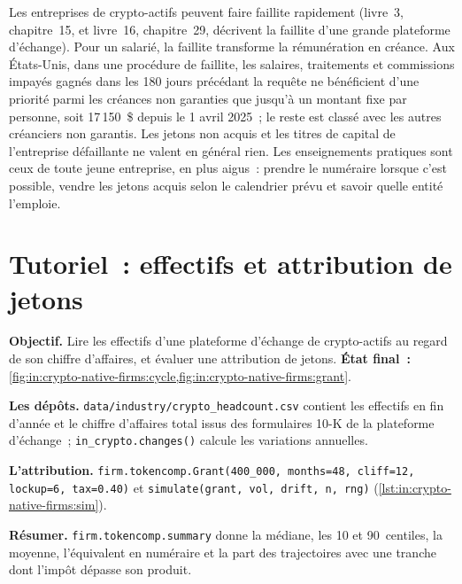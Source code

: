 Les entreprises de crypto-actifs peuvent faire faillite rapidement (livre~3, chapitre~15, et livre~16, chapitre~29, décrivent la faillite d'une grande plateforme d'échange). Pour un
salarié, la faillite transforme la rémunération en créance. Aux États-Unis, dans une procédure de faillite,
les salaires, traitements et commissions impayés gagnés dans les 180 jours précédant la requête ne bénéficient d'une priorité parmi les créances non garanties
que jusqu'à un montant fixe par personne, soit 17\,150~\$ depuis le 1 avril 2025~; le reste est classé avec les autres créanciers non garantis.
Les jetons non acquis et les titres de capital de l'entreprise défaillante ne valent en général rien. Les enseignements pratiques sont ceux de toute
jeune entreprise, en plus aigus~: prendre le numéraire lorsque c'est possible, vendre les jetons acquis selon le calendrier prévu et savoir quelle entité
l'emploie.

\section{Tutoriel~: effectifs et attribution de jetons}\label{tut:in:crypto-native-firms:tut}

\begin{tutorial}
\textbf{Objectif.} Lire les effectifs d'une plateforme d'échange de crypto-actifs au regard de son chiffre d'affaires, et évaluer une attribution de jetons.
\textbf{État final~:} \cref{fig:in:crypto-native-firms:cycle,fig:in:crypto-native-firms:grant}.
\begin{tutsteps}
\item \textbf{Les dépôts.} \texttt{data/industry/crypto\_headcount.csv} contient les effectifs en fin d'année et le chiffre d'affaires total issus
des formulaires 10-K de la plateforme d'échange~; \texttt{in\_crypto.changes()} calcule les variations annuelles.
\item \textbf{L'attribution.} \texttt{firm.tokencomp.Grant(400\_000, months=48, cliff=12, lockup=6, tax=0.40)} et
\texttt{simulate(grant, vol, drift, n, rng)} (\cref{lst:in:crypto-native-firms:sim}).
\label{lst:in:crypto-native-firms:sim}
\item \textbf{Résumer.} \texttt{firm.tokencomp.summary} donne la médiane, les 10 et 90~centiles, la moyenne,
l'équivalent en numéraire et la part des trajectoires avec une tranche dont l'impôt dépasse son produit.
\end{tutsteps}
\end{tutorial}

